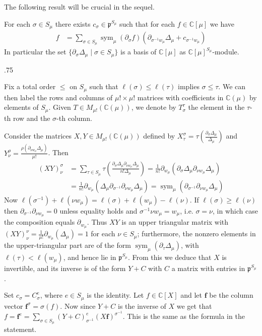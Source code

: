 \documentclass[11pt,fleqn]{article}
\makeatletter
\newcounter{para}[section]
\renewenvironment{proof}[1][\textit{Proof}]{\par
  \pushQED{\qed}%
  \normalfont \topsep.75\paraskip\relax
  \trivlist
  \item[\hskip\labelsep
        \itshape
    #1\@addpunct{.}]\ignorespaces
}{%
  \popQED\endtrivlist\@endpefalse
}
\newcommand\CC{\mathbb C}
\newcommand\p{\mathfrak p}
\DeclareMathOperator\sym{sym}
\makeatother
\begin{document}
The following result will be crucial in the sequel.
\begin{Proposition}
\label{P:multidivided-delta-basis}
For each $\sigma \in S_\mu$ there exists $c_\sigma \in \p^{S_\mu}$ such that 
for each $f \in \CC[\mu]$ we have 
\begin{align*}
f 
  &= \sum_{\sigma \in S_\mu} \sym_\mu(\partial_{\sigma} f) 
    (\partial_{\sigma^{-1}w_\mu} \Delta_\mu + c_{\sigma^{-1}w_\mu})
\end{align*}
In particular the set $\{\partial_\sigma \Delta_\mu \mid \sigma \in S_\mu\}$ 
is a basis of $\CC[\mu]$ as $\CC[\mu]^{S_\mu}$-module.
\end{Proposition}
\begin{proof}
Fix a total order $\leq$ on $S_\mu$ such that $\ell(\sigma) \leq \ell(\tau)$ 
implies $\sigma \leq \tau$. We can then label the rows and columns of $\mu! 
\times \mu!$ matrices with coefficients in $\CC(\mu)$ by elements of $S_\mu$. 
Given $T \in M_{\mu!}(\CC(\mu))$, we denote by $T_\sigma^\tau$ the element in 
the $\tau$-th row and the $\sigma$-th column.

Consider the matrices $X,Y \in M_{\mu!}(\CC(\mu))$ defined by $X^\sigma_\tau = 
\tau \left( \frac{\partial_\sigma \Delta_\mu}{\Delta_\mu} \right)$ and 
$Y^\rho_\nu = \frac{\rho(\partial_{\nu w_\mu} \Delta_\mu)}{\mu!}$. Then
\begin{align*}
(XY)_\nu^\sigma 
  &= \sum_{\tau \in S_\mu} \tau \left( \frac{\partial_\sigma \Delta_\mu
  \partial_{\nu w_\mu} \Delta_\mu }{n!\Delta_\mu} \right)
  = \frac{1}{n!}
    \partial_{w_\mu} (\partial_\sigma \Delta_\mu \partial_{\nu w_\mu} 
      \Delta_\mu)\\
  &= \frac{1}{n!}
    \partial_{w_\mu}(\Delta_\mu \partial_{\sigma^{-1}} \partial_{\nu w_\mu} 
      \Delta_\mu)
  = \sym_\mu(\partial_{\sigma^{-1}} \partial_{\nu w_\mu} \Delta_\mu)
\end{align*}
Now $\ell(\sigma^{-1}) + \ell(\nu w_\mu) = \ell(\sigma) + \ell(w_\mu) - 
\ell(\nu)$. If $\ell(\sigma) \geq \ell(\nu)$ then $\partial_{\sigma^{-1}} 
\partial_{\nu w_\mu} = 0$ unless equality holds and $\sigma^{-1}\nu w_\mu = 
w_\mu$, i.e. $\sigma = \nu$, in which case the composition equals 
$\partial_{w_\mu}$. Thus $XY$ is an upper triangular matrix with 
$(XY)^\nu_\nu = \frac{1}{\mu!}\partial_{w_\mu}(\Delta_\mu) = 1$ for each $\nu 
\in S_\mu$; furthermore, the nonzero elements in the upper-triangular part are 
of the form $\sym_\mu(\partial_\tau \Delta_\mu)$, with $\ell(\tau) < 
\ell(w_\mu)$, and hence lie in $\p^{S_\mu}$. From this we deduce that $X$ is 
invertible, and its inverse is of the form $Y + C$ with $C$ a matrix with 
entries in $\p^{S_\mu}$. 

Set $c_\sigma = C_\sigma^e$, where $e \in S_\mu$ is the identity.
Let $f \in \CC[X]$ and let $\mathbf f$ be the column vector $\mathbf f^\sigma
= \sigma(f)$. Now since $Y+C$ is the inverse of $X$ we get that $f = \mathbf
f^e = \sum_{\sigma \in S_\mu} (Y+C)_{\sigma^{-1}}^e 
(X \mathbf f)^{\sigma^{-1}}$. This is the same as the formula in the 
statement.
\end{proof}
\end{document}
